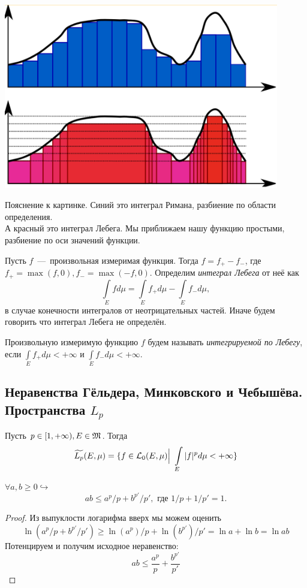 \begin{minipage}{0.5\textwidth}%
    \includegraphics[width=0.9\textwidth]{images/Screenshot_7.png} 
\end{minipage}%
 \hfill%
 \begin{minipage}{0.5\textwidth}\raggedright
Пояснение к картинке. Синий это интеграл Римана, разбиение по области определения.\\ А красный это интеграл Лебега. Мы приближаем нашу функцию простыми, разбиение по оси значений функции.
 \end{minipage}


\begin{definition}
    Пусть $f$~---~произвольная измеримая функция. Тогда $f = f_+ - f_-$, где $f_+ = \max(f, 0), f_- = \max(-f, 0)$. Определим \textit{интеграл Лебега} от неё как \[\int\limits_E fd\mu = \int\limits_E f_+d\mu - \int\limits_E f_-d\mu,\] в случае конечности интегралов от неотрицательных частей. Иначе будем говорить что интеграл Лебега не определён.
\end{definition}
\begin{definition}
    Произвольную измеримую функцию $f$ будем называть \textit{интегрируемой по Лебегу}, если $\int\limits_E f_+d\mu < +\infty$ и $\int\limits_E f_-d\mu < +\infty$.
\end{definition}

\subsection{Неравенства Гёльдера, Минковского и Чебышёва. Пространства $L_p$}
\begin{definition}
    Пусть $p \in [1, +\infty), E \in \mathfrak{M}$. Тогда \[\widetilde{L_p}(E, \mu) = \{f \in \mathcal{L}_0(E, \mu) \Big | \ \int\limits_E |f|^pd\mu < +\infty\}\]
\end{definition}
\begin{lemma}
    $\forall a, b \geq 0 \hookrightarrow $
    \[ab \leq a^p/p + b^{p'}/p',\text{ где }1/p + 1/p' = 1.\]
\end{lemma}
\begin{proof}
    Из выпуклости логарифма вверх  мы можем оценить
    $$\ln(a^p/p + b^{p'}/p') \geq \ln(a^p)/p + \ln(b^{p'})/p' = \ln a + \ln b = \ln ab$$ Потенцируем и получим исходное неравенство:
    \[ab \leq \dfrac{a^p}{p} + \dfrac{b^{p'}}{p'}\]
\end{proof}

